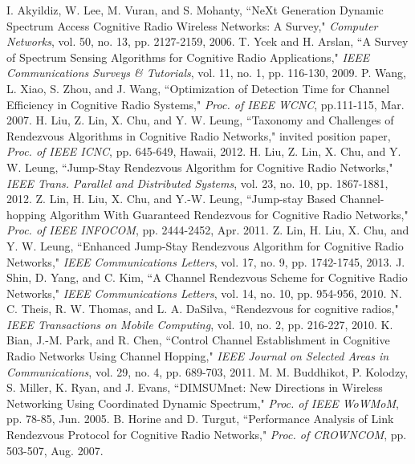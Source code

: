 \documentclass[journal]{IEEEtran}
\begin{document}
\begin{thebibliography}{1}

I. Akyildiz, W. Lee, M. Vuran, and S. Mohanty, ``NeXt Generation Dynamic Spectrum Access Cognitive Radio Wireless Networks: A Survey," \emph{Computer Networks}, vol. 50, no. 13, pp. 2127-2159, 2006.
T. Ycek and H. Arslan, ``A Survey of Spectrum Sensing Algorithms for Cognitive Radio Applications," \emph{IEEE Communications Surveys \& Tutorials}, vol. 11, no. 1, pp. 116-130, 2009.
P. Wang, L. Xiao, S. Zhou, and J. Wang, ``Optimization of Detection Time for Channel Efficiency in Cognitive Radio Systems," \emph{Proc. of IEEE WCNC}, pp.111-115, Mar. 2007.
H. Liu, Z. Lin, X. Chu, and Y. W. Leung, ``Taxonomy and Challenges of Rendezvous Algorithms in Cognitive Radio Networks," invited position paper, \emph{Proc. of IEEE ICNC}, pp. 645-649, Hawaii, 2012.
H. Liu,  Z. Lin,  X. Chu, and Y. W. Leung, ``Jump-Stay Rendezvous Algorithm for Cognitive Radio Networks," \emph{IEEE Trans. Parallel and Distributed  Systems}, vol. 23, no. 10, pp. 1867-1881, 2012.
Z. Lin, H. Liu, X. Chu, and Y.-W. Leung, ``Jump-stay Based Channel-hopping Algorithm With Guaranteed Rendezvous for Cognitive Radio Networks," \emph{Proc. of IEEE INFOCOM}, pp. 2444-2452, Apr. 2011.
Z. Lin,  H. Liu,  X. Chu, and Y. W. Leung, ``Enhanced Jump-Stay Rendezvous Algorithm for Cognitive Radio Networks," \emph{IEEE Communications Letters}, vol. 17, no. 9, pp. 1742-1745, 2013.
J. Shin, D. Yang, and C. Kim, ``A Channel Rendezvous Scheme for Cognitive Radio Networks," \emph{IEEE Communications Letters}, vol. 14, no. 10, pp. 954-956, 2010.
N. C. Theis, R. W. Thomas, and L. A. DaSilva, ``Rendezvous for cognitive radios," \emph{IEEE Transactions on Mobile Computing}, vol. 10, no. 2, pp. 216-227, 2010.
K. Bian, J.-M. Park, and R. Chen, ``Control Channel Establishment in Cognitive Radio Networks Using Channel Hopping," \emph{IEEE Journal on Selected Areas in Communications}, vol. 29, no. 4, pp. 689-703, 2011.
M. M. Buddhikot, P. Kolodzy, S. Miller, K. Ryan, and J. Evans, ``DIMSUMnet: New Directions in Wireless Networking Using Coordinated Dynamic Spectrum," \emph{Proc. of IEEE WoWMoM}, pp. 78-85, Jun. 2005.
B. Horine and D. Turgut, ``Performance Analysis of Link Rendezvous Protocol for Cognitive Radio Networks," \emph{Proc. of CROWNCOM}, pp. 503-507, Aug. 2007.

\end{thebibliography}
\end{document}
